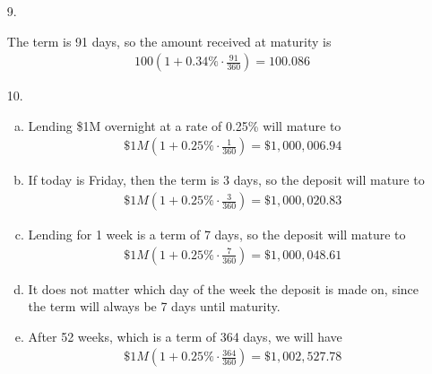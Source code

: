\documentclass{article}
\begin{document}
\begin{enumerate}
	\item[9.]
		\begin{soln}
			The term is 91 days, so the amount received at maturity is
			\begin{align*}
				100\left( 1+0.34\%\cdot \frac{91}{360} \right) = 100.086
			\end{align*}
		\end{soln}

	\item[10.]
		\begin{enumerate}[(a)]
			\item 
				\begin{soln}
					Lending \$1M overnight at a rate of 0.25\% will mature to
					\begin{align*}
						\$1M\left( 1+0.25\%\cdot \frac{1}{360} \right) = \$1, 000, 006.94
					\end{align*}
				\end{soln}

			\item 
				\begin{soln}
					If today is Friday, then the term is 3 days, so the deposit will mature to
					\begin{align*}
						\$1M\left( 1+0.25\%\cdot \frac{3}{360} \right) = \$1, 000, 020.83
					\end{align*}
				\end{soln}

			\item
				\begin{soln}
					Lending for 1 week is a term of 7 days, so the deposit will mature to
					\begin{align*}
						\$1M\left( 1+0.25\%\cdot \frac{7}{360} \right) = \$1, 000, 048.61
					\end{align*}
				\end{soln}

			\item 
				\begin{soln}
					It does not matter which day of the week the deposit is made on, since the term will always be 7 days until maturity.
				\end{soln}

			\item 
				\begin{soln}
					After 52 weeks, which is a term of 364 days, we will have
					\begin{align*}
						\$1M\left( 1+0.25\%\cdot \frac{364}{360} \right) = \$1, 002, 527.78
					\end{align*}
				\end{soln}


\end{enumerate}
\end{enumerate}
\end{document}
